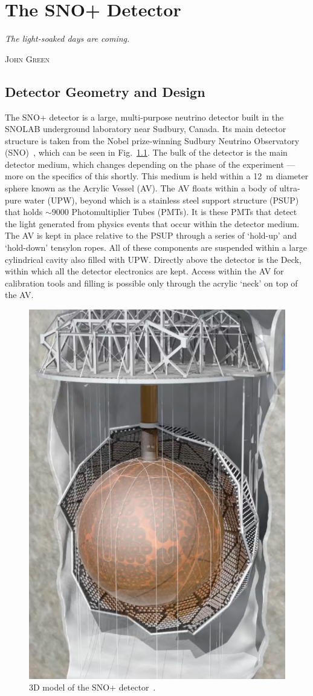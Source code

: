 
\chapter{The SNO+ Detector}\label{chap:detector}
\epigraph{\textit{The light-soaked days are coming.}}{\textsc{John Green}}
\section{Detector Geometry and Design}
The SNO+ detector is a large, multi-purpose neutrino detector built in the SNOLAB underground laboratory near Sudbury, Canada. Its main detector structure is taken from the Nobel prize-winning Sudbury Neutrino Observatory (SNO)~\cite{}, %
which can be seen in Fig.~\ref{fig:snoplus_detector}. The bulk of the detector is the main detector medium, which changes depending on the phase of the experiment --- more on the specifics of this shortly. This medium is held within a \SI{12}{\metre} diameter sphere known as the Acrylic Vessel (AV). The AV floats within a body of ultra-pure water (UPW), beyond which is a stainless steel support structure (PSUP) that holds $\sim\num{9000}$ Photomultiplier Tubes (PMTs). It is these PMTs that detect the light generated from physics events that occur within the detector medium. The AV is kept in place relative to the PSUP through a series of `hold-up' and `hold-down' tensylon ropes. All of these components are suspended within a large cylindrical cavity also filled with UPW. Directly above the detector is the Deck, within which all the detector electronics are kept. Access within the AV for calibration tools and filling is possible only through the acrylic `neck' on top of the AV.

\begin{figure}
    \centering
    \includegraphics[width=0.48\linewidth]{2_Detector/Figs/detector_picture.png}
    \caption[3D model of the SNO+ detector]{3D model of the SNO+ detector~\cite{albanese_sno_2021}.}
    \label{fig:snoplus_detector}
\end{figure}


